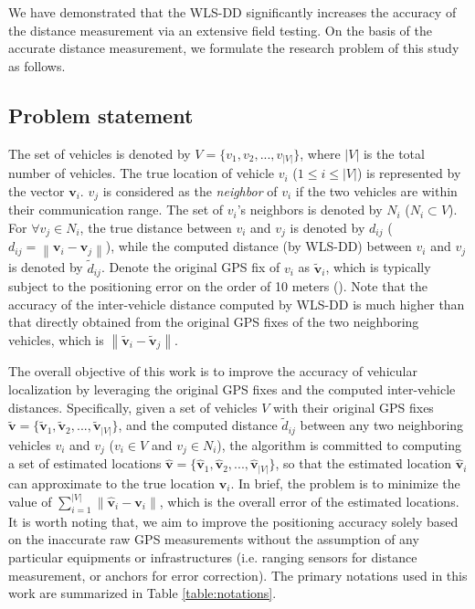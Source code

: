 \documentclass[letterpaper, 10 pt, conference]{ieeeconf}
\begin{document}
We have demonstrated that the WLS-DD significantly increases the accuracy of the distance measurement via an extensive field testing. On the basis of the accurate distance measurement, we formulate the research problem of this study as follows.

\subsection{Problem statement}
The set of vehicles is denoted by $V = \{ v_1 ,v_2 ,...,v_{\left| V \right|} \}$, where $|V|$ is the total number of vehicles. The true location of vehicle $v_i$ ($1 \leq i\leq|V|$) is represented by the vector $\mathbf{v}_i$. $v_j$ is considered as the \emph{neighbor} of $v_i$ if the two vehicles are within their communication range. The set of $v_i$'s neighbors is denoted by $N_i$ ($N_i  \subset V$). For $\forall v_j  \in N_i $, the true distance between $v_i$ and $v_j$  is denoted by $d_{ij}$ ($d_{ij}  = \left\| {{\mathbf{v}_i}  - {\mathbf{v}}_j } \right\|$), while the computed distance (by WLS-DD) between $v_i$ and $v_j$  is denoted by $\tilde d_{ij} $. Denote the original GPS fix of $v_i$  as ${\mathbf{\tilde v}}_i$, which is typically  subject to the positioning error on the order of 10 meters (\cite{boukerche2008vehicular, schubert2007accurate}). Note that the accuracy of the  inter-vehicle distance computed by WLS-DD is much higher than that directly obtained from the original GPS fixes of the two neighboring vehicles, which is $\left\| {{\mathbf{\tilde v}}_i  - {\mathbf{\tilde v}}_j } \right\|$.

The overall objective of this work is to improve the accuracy of vehicular localization by leveraging the original GPS fixes and the computed inter-vehicle distances. Specifically, given a set of vehicles $V$ with their original GPS fixes ${\mathbf{\tilde v}} = \{ {\mathbf{\tilde v}}_1 ,{\mathbf{\tilde v}}_2 ,...,{\mathbf{\tilde v}}_{|V|} \} $, and the computed distance $\tilde d_{ij} $  between any two neighboring vehicles $v_i$ and $v_j$ ($v_i \in V$ and $v_j \in N_i$), the algorithm is committed to computing a set of estimated locations ${\mathbf{\hat v}} = \{ {\mathbf{\hat v}}_1 ,{\mathbf{\hat v}}_2 ,...,{\mathbf{\hat v}}_{|V|} \} $, so that the estimated location ${\mathbf{\hat v}}_i $ can approximate to the true location  ${\mathbf{v}}_i $. In brief, the problem is to minimize the value of $\sum\limits_{i = 1}^{|V|} {\left\| {{\mathbf{\hat v}}_i  - {\mathbf{v}}_i } \right\|} $, which is the overall error of the estimated locations. It is worth noting that, we aim to improve the positioning accuracy solely based on the inaccurate raw GPS measurements without the assumption of any particular equipments or infrastructures (i.e. ranging sensors for distance measurement, or anchors for error correction). The primary notations used in this work are summarized in Table \ref{table:notations}.
\end{document}
